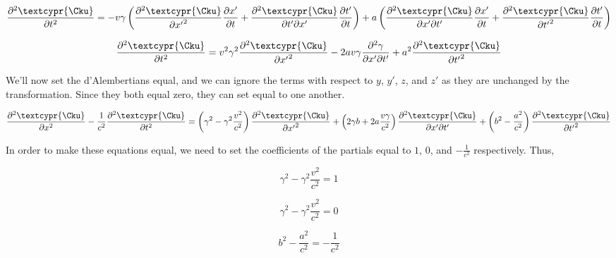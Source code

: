 \documentclass{article}
\begin{document}
\begin{equation}
\frac{\partial^2{\textcypr{\Cku}}}{\partial{t}^2} = -v\gamma\left(\frac{\partial^2{\textcypr{\Cku}}}{\partial{x'}^2}\frac{\partial{x'}}{\partial{t}} + \frac{\partial^2{\textcypr{\Cku}}}{\partial{t'}\partial{x'}} \frac{\partial{t'}}{\partial{t}} \right) + a\left( \frac{\partial^2{\textcypr{\Cku}}}{\partial{x'}\partial{t'}} \frac{\partial{x'}}{\partial{t}} + \frac{\partial^2{\textcypr{\Cku}}}{\partial{t'}^2}\frac{\partial{t'}}{\partial{t}}\right)
\end{equation}

\begin{equation}
\frac{\partial^2{\textcypr{\Cku}}}{\partial{t}^2} = v^2\gamma^2\frac{\partial^2{\textcypr{\Cku}}}{\partial{x'}^2} - 2av\gamma\frac{\partial^2{\gamma}}{\partial{x'}\partial{t'}} + a^2\frac{\partial^2{\textcypr{\Cku}}}{\partial{t'}^2}
\end{equation}

\smallskip

We'll now set the d'Alembertians equal, and we can ignore the terms with respect to $y$, $y'$, $z$, and $z'$ as they are unchanged by the transformation. Since they both equal zero, they can set equal to one another.

\begin{equation}
\frac{\partial^2{\textcypr{\Cku}}}{\partial{x}^2} - \frac{1}{c^2}\frac{\partial^2{\textcypr{\Cku}}}{\partial{t}^2} = \left( \gamma^2 - \gamma^2\frac{v^2}{c^2} \right)\frac{\partial^2{\textcypr{\Cku}}}{\partial{x'}^2} + \left( 2\gamma b + 2a\frac{v\gamma}{c^2}\right)\frac{\partial^2{\textcypr{\Cku}}}{\partial{x'}\partial{t'}} + \left( b^2 - \frac{a^2}{c^2} \right)\frac{\partial^2{\textcypr{\Cku}}}{\partial{t'}^2}
\end{equation}

In order to make these equations equal, we need to set the coefficients of the partials equal to $1$, $0$, and $-\frac{1}{c^2}$ respectively.  Thus,

\begin{equation}
\gamma^2 - \gamma^2 \frac{v^2}{c^2} = 1
\end{equation}

\begin{equation}
\gamma^2 - \gamma^2 \frac{v^2}{c^2} = 0
\end{equation}

\begin{equation}
b^2 - \frac{a^2}{c^2} = -\frac{1}{c^2}
\end{equation}
\end{document}
